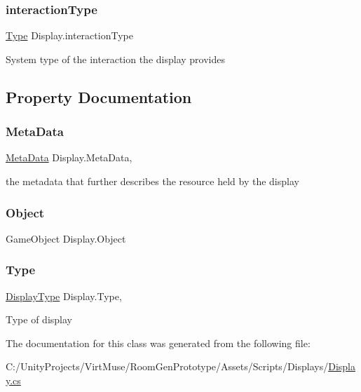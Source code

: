 \subsubsection{\texorpdfstring{interaction\+Type}{interactionType}}
{\footnotesize\ttfamily \mbox{\hyperlink{class_display_a2c80ba13fff1fd81aaa6915b28e8c14f}{Type}} Display.\+interaction\+Type\hspace{0.3cm}{\ttfamily [protected]}}



System type of the interaction the display provides 



\subsection{Property Documentation}
\mbox{\label{class_display_a9ae693bcb1553822aed7ae887a65591c}} 
\subsubsection{\texorpdfstring{Meta\+Data}{MetaData}}
{\footnotesize\ttfamily \mbox{\hyperlink{class_meta_data}{Meta\+Data}} Display.\+Meta\+Data\hspace{0.3cm}{\ttfamily [get]}, {}}



the metadata that further describes the resource held by the display 

\mbox{\label{class_display_a32b9644a140d330a9c51cfdbb6f6093c}} 
\subsubsection{\texorpdfstring{Object}{Object}}
{\footnotesize\ttfamily Game\+Object Display.\+Object\hspace{0.3cm}{\ttfamily [get]}}

\mbox{\label{class_display_a2c80ba13fff1fd81aaa6915b28e8c14f}} 
\subsubsection{\texorpdfstring{Type}{Type}}
{\footnotesize\ttfamily \mbox{\hyperlink{class_display_a7f7abc559192ef7e8f4a03382d3492d7}{Display\+Type}} Display.\+Type\hspace{0.3cm}{\ttfamily [get]}, {}}



Type of display 



The documentation for this class was generated from the following file\+:\begin{DoxyCompactItemize}
\item 
C\+:/\+Unity\+Projects/\+Virt\+Muse/\+Room\+Gen\+Prototype/\+Assets/\+Scripts/\+Displays/\mbox{\hyperlink{_display_8cs}{Display.\+cs}}\end{DoxyCompactItemize}
